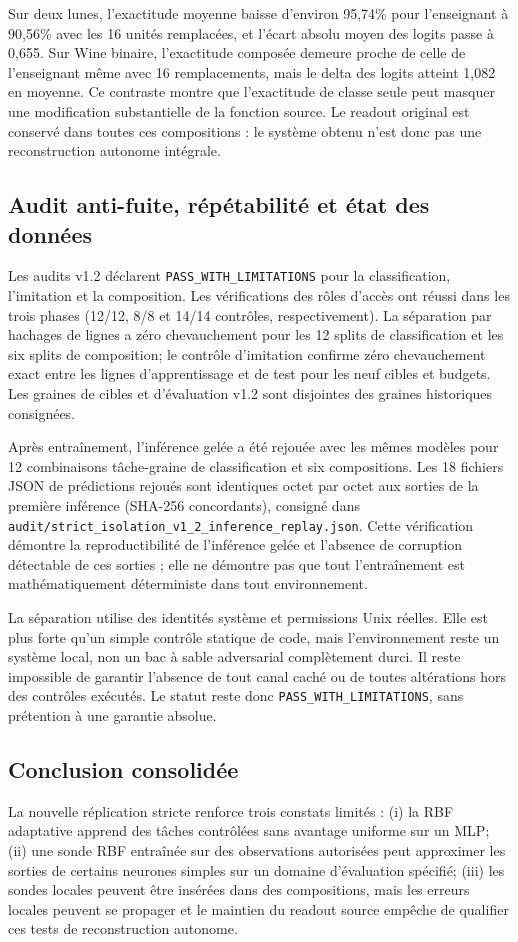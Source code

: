 \documentclass[11pt,a4paper]{article}
\begin{document}
Sur deux lunes, l'exactitude moyenne baisse d'environ 95,74\% pour l'enseignant à 90,56\% avec les 16 unités remplacées, et l'écart absolu moyen des logits passe à 0,655. Sur Wine binaire, l'exactitude composée demeure proche de celle de l'enseignant même avec 16 remplacements, mais le delta des logits atteint 1,082 en moyenne. Ce contraste montre que l'exactitude de classe seule peut masquer une modification substantielle de la fonction source. Le readout original est conservé dans toutes ces compositions : le système obtenu n'est donc pas une reconstruction autonome intégrale.

\subsection{Audit anti-fuite, répétabilité et état des données}
Les audits v1.2 déclarent \texttt{PASS\_WITH\_LIMITATIONS} pour la classification, l'imitation et la composition. Les vérifications des rôles d'accès ont réussi dans les trois phases (12/12, 8/8 et 14/14 contrôles, respectivement). La séparation par hachages de lignes a zéro chevauchement pour les 12 splits de classification et les six splits de composition; le contrôle d'imitation confirme zéro chevauchement exact entre les lignes d'apprentissage et de test pour les neuf cibles et budgets. Les graines de cibles et d'évaluation v1.2 sont disjointes des graines historiques consignées.

Après entraînement, l'inférence gelée a été rejouée avec les mêmes modèles pour 12 combinaisons tâche-graine de classification et six compositions. Les 18 fichiers JSON de prédictions rejoués sont identiques octet par octet aux sorties de la première inférence (SHA-256 concordants), consigné dans \texttt{audit/strict\_isolation\_v1\_2\_inference\_replay.json}. Cette vérification démontre la reproductibilité de l'inférence gelée et l'absence de corruption détectable de ces sorties ; elle ne démontre pas que tout l'entraînement est mathématiquement déterministe dans tout environnement.

La séparation utilise des identités système et permissions Unix réelles. Elle est plus forte qu'un simple contrôle statique de code, mais l'environnement reste un système local, non un bac à sable adversarial complètement durci. Il reste impossible de garantir l'absence de tout canal caché ou de toutes altérations hors des contrôles exécutés. Le statut reste donc \texttt{PASS\_WITH\_LIMITATIONS}, sans prétention à une garantie absolue.

\subsection{Conclusion consolidée}
La nouvelle réplication stricte renforce trois constats limités : (i) la RBF adaptative apprend des tâches contrôlées sans avantage uniforme sur un MLP; (ii) une sonde RBF entraînée sur des observations autorisées peut approximer les sorties de certains neurones simples sur un domaine d'évaluation spécifié; (iii) les sondes locales peuvent être insérées dans des compositions, mais les erreurs locales peuvent se propager et le maintien du readout source empêche de qualifier ces tests de reconstruction autonome.
\end{document}
